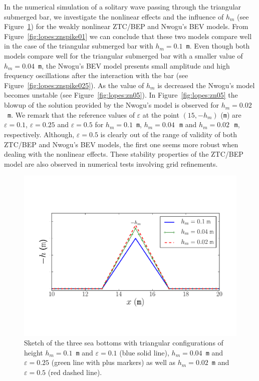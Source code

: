 In the numerical simulation of a solitary wave passing through the
triangular submerged bar, we investigate the nonlinear effects and the
influence of $h_m$ (see Figure~\ref{fig:lopes:spikes}) for the weakly
nonlinear ZTC/BEP and Nwogu's BEV models.  From
Figure~\ref{fig:lopes:znspike01} we can conclude that these two models
compare well in the case of the triangular submerged bar with
$h_m=0.1$~{\tt m}.  Even though both models compare well for the
triangular submerged bar with a smaller value of $h_m=0.04$~{\tt m},
the Nwogu's BEV model presents small amplitude and high frequency
oscillations after the interaction with the bar (see
Figure~\ref{fig:lopes:znspike025}).  As the value of $h_m$ is
decreased the Nwogu's model becomes unstable (see
Figure~\ref{fig:lopes:zn05}).  In Figure~\ref{fig:lopes:zn05} the
blowup of the solution provided by the Nwogu's model is observed for
$h_m=0.02$~{\tt m}.  We remark that the reference values of
$\varepsilon$ at the point $(15,-h_m)$ ({\tt m}) are
$\varepsilon=0.1$, $\varepsilon=0.25$ and $\varepsilon=0.5$ for
$h_m=0.1$~{\tt m}, $h_m=0.04$\,~{\tt m} and $h_m=0.02$\,~{\tt m},
respectively. Although, $\varepsilon=0.5$ is clearly out of the range
of validity of both ZTC/BEP and Nwogu's BEV models, the first one
seems more robust when dealing with the nonlinear effects. These
stability properties of the ZTC/BEP model are also observed in
numerical tests involving grid refinements.

\begin{figure}
  \centering
  \includegraphics[width=\largefig]{chapters/lopes/pdf/deptheps.pdf}
  \caption{Sketch of the three sea bottoms with triangular
    configurations of height $h_m=0.1$~{\tt m} and $\varepsilon=0.1$ (blue
    solid line), $h_m=0.04$~{\tt m} and $\varepsilon=0.25$ (green line
    with plus markers) as well as $h_m=0.02$~{\tt m} and $\varepsilon=0.5$
    (red dashed line).}
  \label{fig:lopes:spikes}
\end{figure}

